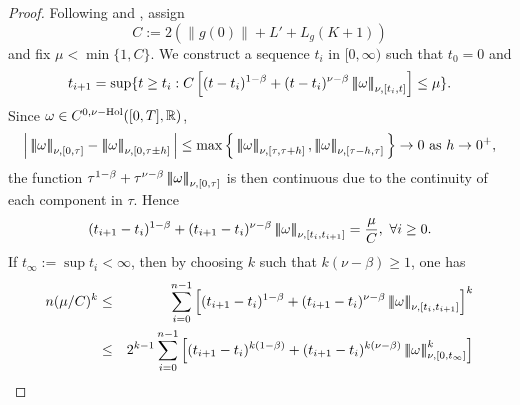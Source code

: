\documentclass[graybox]{svmult}
\newcommand{\R}{\ensuremath{\mathbb{R}}}
\newcommand{\N}{\ensuremath{\mathbb{N}}}
\newcommand{\ltn}{\ensuremath{\left| \! \left| \! \left|}}
\newcommand{\rtn}{\ensuremath{\right| \! \right| \! \right|}}
\begin{document}
\begin{proof}
	Following \cite{congduchong} and \cite{duc1} , assign
	\begin{equation}\label{eqCmax}
	C :=  2(\|g(0)\|+ L' + L_g (K+1))
	\end{equation}
	and fix $\mu < \min\{1,C\}$. We construct a sequence $t_i$ in $[0,\infty)$ such that $t_0=0$ and 
	\[
	t_{i+1}= \sup \{t\geq t_i : C\left[(t-t_i)^{1-\beta} + (t-t_i)^{\nu-\beta} \ltn \omega\rtn_{\nu,[t_i,t]} \right]\leq\mu\}.
	\]
	Since $\omega \in C^{0,\nu\rm{-Hol}}([0,T],\R)$,
	\[
	\Big|\ltn \omega\rtn_{\nu,[0,\tau]} - \ltn \omega\rtn_{\nu,[0,\tau\pm h]}\Big| \leq \max \Big\{\ltn \omega\rtn_{\nu,[\tau,\tau+h]}, \ltn \omega\rtn_{\nu,[\tau-h,\tau]} \Big\} \to 0 \text{\ as\ } h \to 0^+,
	\]
	the function $\tau^{1-\beta} + \tau^{\nu-\beta}\ltn \omega\rtn_{\nu,[0,\tau]}$ is then continuous due to the continuity of each component in $\tau$. Hence 
	\begin{equation}\label{stoppingtime}
	(t_{i+1} - t_i)^{1-\beta} + (t_{i+1} - t_i)^{\nu-\beta}   \ltn \omega\rtn_{\nu,[t_i,t_{i+1}]} = \frac{\mu}{C},\ \forall i \geq 0.
	\end{equation}
	If $t_\infty:=\sup t_i < \infty$, then by choosing $k$ such that $k(\nu-\beta)\geq 1$, one has
	\begin{eqnarray*}
		n(\mu/C)^k&\leq& \sum_{i=0}^{n-1} \left[ (t_{i+1}-t_i)^{1-\beta} + (t_{i+1}-t_i)^{\nu-\beta} \ltn \omega\rtn_{\nu,[t_i,t_{i+1}]}\right]^k\\
		&\leq &  2^{k-1}\sum_{i=0}^{n-1} \left[ (t_{i+1}-t_i)^{k(1-\beta)} + (t_{i+1}-t_i)^{k(\nu-\beta)} \ltn \omega\rtn^k_{\nu,[0,t_\infty]}\right]\\

\end{eqnarray*}
\end{proof}
\end{document}
